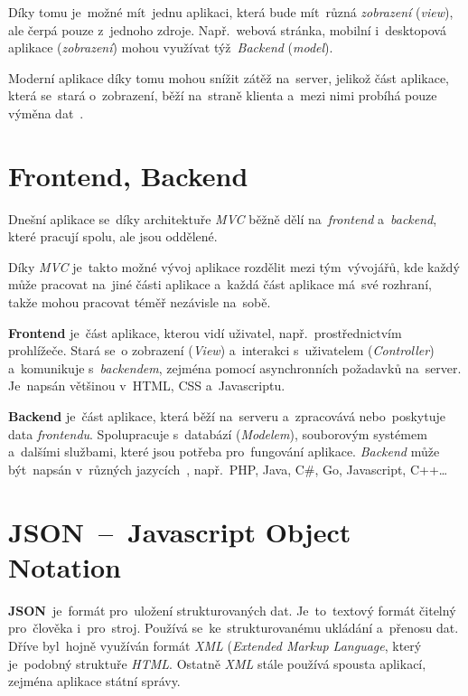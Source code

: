 \documentclass[11pt,a4paper]{report}
\begin{document}
            Díky tomu je~možné mít~jednu aplikaci, která bude mít~různá \emph{zobrazení} (\emph{view}), ale čerpá pouze z~jednoho zdroje. Např.~webová stránka, mobilní i~desktopová aplikace (\emph{zobrazení}) mohou využívat týž~\emph{Backend} (\emph{model}).
            
            Moderní aplikace díky tomu mohou snížit zátěž na~server, jelikož část aplikace, která se~stará o~zobrazení, běží na~straně klienta a~mezi nimi probíhá pouze výměna dat~\cite{MVC}.

        \section{Frontend, Backend}
            Dnešní aplikace se~díky architektuře \emph{MVC} běžně dělí na~\emph{frontend} a~\emph{backend}, které pracují spolu, ale jsou oddělené.

            Díky \emph{MVC} je~takto možné vývoj aplikace rozdělit mezi tým~vývojářů, kde každý může pracovat na~jiné části aplikace a~každá část aplikace má~své rozhraní, takže mohou pracovat téměř nezávisle na~sobě.

            \textbf{Frontend} je~část aplikace, kterou vidí uživatel, např.~prostřednictvím prohlížeče. Stará se~o zobrazení (\emph{View}) a~interakci s~uživatelem (\emph{Controller}) a~komunikuje s~\emph{backendem}, zejména pomocí asynchronních požadavků na~server. Je~napsán většinou v~HTML, CSS a~Javascriptu.

            \textbf{Backend} je~část aplikace, která běží na~serveru a~zpracovává nebo~poskytuje data \emph{frontendu}. Spolupracuje s~databází (\emph{Modelem}), souborovým systémem a~dalšími službami, které jsou potřeba pro~fungování aplikace. \emph{Backend} může být~napsán v~různých jazycích~\cite{Dorman:webmappingajax, Zimmerman2023:howtowritebetter}, např.~PHP, Java, C\#, Go, Javascript, C++\dots

        \section{JSON~--~Javascript Object Notation}
            \textbf{JSON}~je~formát pro~uložení strukturovaných dat. Je~to~textový formát čitelný pro~člověka i~pro~stroj. Používá se~ke~strukturovanému ukládání a~přenosu dat. Dříve byl~hojně využíván formát \emph{XML} (\emph{Extended Markup Language}, který je~podobný struktuře \emph{HTML}. Ostatně \emph{XML} stále používá spousta aplikací, zejména aplikace státní správy.
\end{document}
